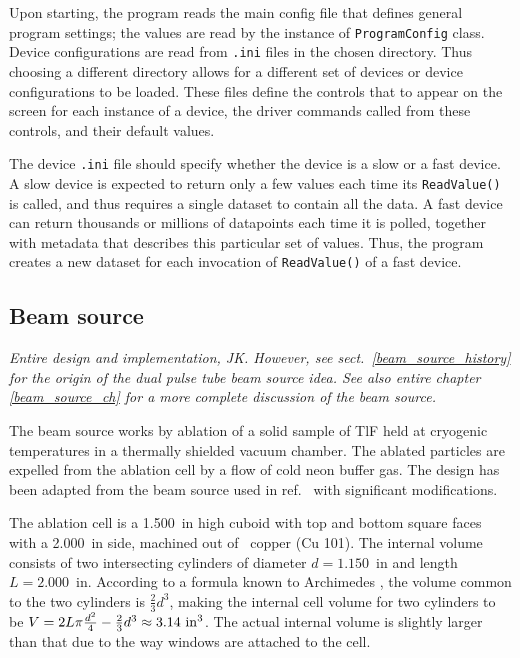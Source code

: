Upon starting, the program reads the main config file that defines general
program settings; the values are read by the instance of \verb`ProgramConfig`
class. Device configurations are read from \verb`.ini` files in the chosen
directory. Thus choosing a different directory allows for a different set of
devices or device configurations to be loaded. These files define the controls
that to appear on the screen for each instance of a device, the driver commands
called from these controls, and their default values.

The device \verb`.ini` file should specify whether the device is a slow or a
fast device.  A slow device is expected to return only a few values each time
its \verb`ReadValue()` is called, and thus requires a single dataset to contain
all the data. A fast device can return thousands or millions of datapoints each
time it is polled, together with metadata that describes this particular set of
values. Thus, the program creates a new dataset for each invocation of
\verb`ReadValue()` of a fast device.

\subsection{Beam source}
\label{sect:beamsource}

\textit{Entire design and implementation, JK. However, see
sect.~\ref{beam_source_history} for the origin of the dual pulse tube beam
source idea. See also entire chapter \ref{beam_source_ch} for a more complete
discussion of the beam source.}

The beam source works by ablation of a solid sample of TlF held at cryogenic
temperatures in a thermally shielded vacuum chamber. The ablated particles are
expelled from the ablation cell by a flow of cold neon buffer gas. The design
has been adapted from the beam source used in ref.~\cite{barry2011bright} with
significant modifications.

The ablation cell is a 1.500~in high cuboid with top and bottom square faces
with a 2.000~in side, machined out of \OFHC\ copper (Cu 101). The internal
volume consists of two intersecting cylinders of diameter $d=1.150$~in and
length $L=2.000$~in. According to a formula known to Archimedes
\cite{moore1974symmetrical}, the volume common to the two cylinders is
$\frac{2}{3}d^3$, making the internal cell volume for two cylinders to be
$V=2L\pi\frac{d^2}{4}-\frac{2}{3}d^3\approx3.14~\mathrm{in}^3$. The actual internal
volume is slightly larger than that due to the way windows are attached to the
cell.

